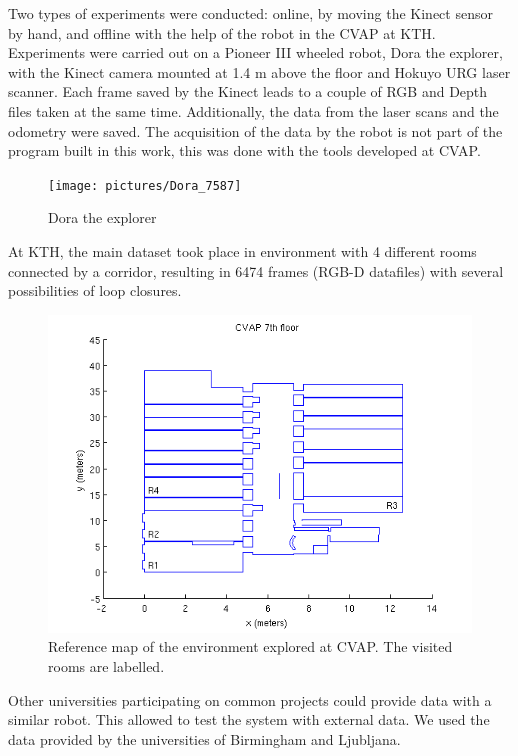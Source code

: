 Two types of experiments were conducted: online, by moving the Kinect sensor by hand, and offline with the help of the robot in the \gls{CVAP} at KTH. Experiments were carried out on a Pioneer III wheeled robot, Dora the explorer, with the Kinect camera mounted at 1.4 m above the floor and Hokuyo URG laser scanner. Each frame saved by the Kinect leads to a couple of RGB and Depth files taken at the same time. Additionally, the data from the laser scans and the odometry were saved. The acquisition of the data by the robot is not part of the program built in this work, this was done with the tools developed at \gls{CVAP}.

\begin{figure}[h]
 \begin{center}
 \texttt{[image: pictures/Dora\_7587]}
 \end{center}
\caption{Dora the explorer}
\end{figure}

At KTH, the main dataset took place in environment with 4 different rooms connected by a corridor, resulting in 6474 frames (RGB-D datafiles) with several possibilities of loop closures. 

\begin{figure}[H]
\centering
\includegraphics[width=1\textwidth]{figures/cvap_7th}
\caption{Reference map of the environment explored at CVAP. The visited rooms are labelled.}
\end{figure}

Other universities participating on common projects could provide data with a similar robot. This allowed to test the system with external data. We used the data provided by the universities of Birmingham and Ljubljana.

